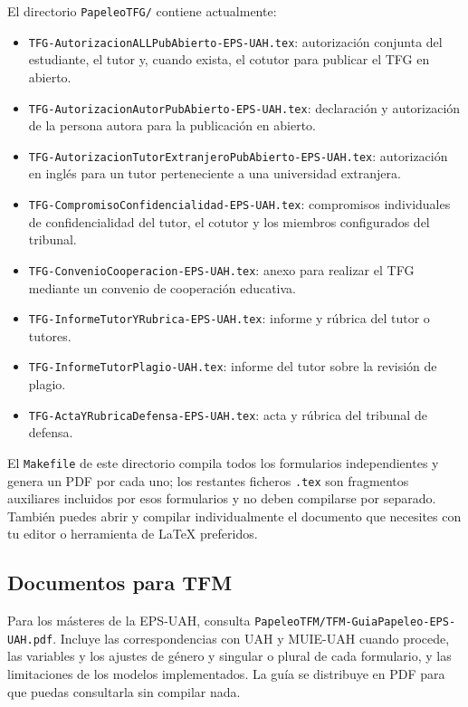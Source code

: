 El directorio \texttt{PapeleoTFG/} contiene actualmente:

\begin{itemize}
  \item \texttt{TFG-AutorizacionALLPubAbierto-EPS-UAH.tex}: autorización conjunta del estudiante, el tutor y, cuando exista, el cotutor para publicar el TFG en abierto.
  \item \texttt{TFG-AutorizacionAutorPubAbierto-EPS-UAH.tex}: declaración y autorización de la persona autora para la publicación en abierto.
  \item \texttt{TFG-AutorizacionTutorExtranjeroPubAbierto-EPS-UAH.tex}: autorización en inglés para un tutor perteneciente a una universidad extranjera.
  \item \texttt{TFG-CompromisoConfidencialidad-EPS-UAH.tex}: compromisos individuales de confidencialidad del tutor, el cotutor y los miembros configurados del tribunal.
  \item \texttt{TFG-ConvenioCooperacion-EPS-UAH.tex}: anexo para realizar el TFG mediante un convenio de cooperación educativa.
  \item \texttt{TFG-InformeTutorYRubrica-EPS-UAH.tex}: informe y rúbrica del tutor o tutores.
  \item \texttt{TFG-InformeTutorPlagio-UAH.tex}: informe del tutor sobre la revisión de plagio.
  \item \texttt{TFG-ActaYRubricaDefensa-EPS-UAH.tex}: acta y rúbrica del tribunal de defensa.
\end{itemize}

El \texttt{Makefile} de este directorio compila todos los formularios independientes y genera un PDF por cada uno; los restantes ficheros \texttt{.tex} son fragmentos auxiliares incluidos por esos formularios y no deben compilarse por separado. También puedes abrir y compilar individualmente el documento que necesites con tu editor o herramienta de \LaTeX{} preferidos.

\subsection{Documentos para TFM}

Para los másteres de la EPS-UAH, consulta \texttt{PapeleoTFM/TFM-GuiaPapeleo-EPS-UAH.pdf}. Incluye las correspondencias con UAH y MUIE-UAH cuando procede, las variables y los ajustes de género y singular o plural de cada formulario, y las limitaciones de los modelos implementados. La guía se distribuye en PDF para que puedas consultarla sin compilar nada.

